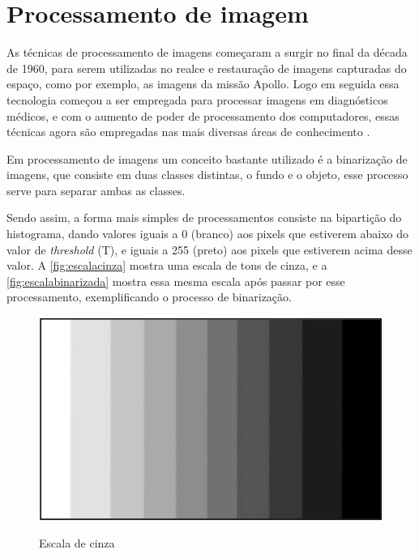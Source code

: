 \section{Processamento de imagem}\label{sec:processamento}

As técnicas de processamento de imagens começaram a surgir no final da década de 1960, 
para serem utilizadas no realce e restauração de imagens capturadas do espaço, 
como por exemplo, as imagens da missão Apollo. Logo em seguida essa tecnologia 
começou a ser empregada para processar imagens em diagnósticos médicos, e com 
o aumento de poder de processamento dos computadores, essas técnicas agora 
são empregadas nas mais diversas áreas de conhecimento \cite{gonzalez2010}.

Em processamento de imagens um conceito bastante utilizado é a binarização de
imagens, que consiste em duas classes distintas, o fundo e o objeto, esse processo 
serve para separar ambas as classes.

Sendo assim, a forma mais simples de processamentos consiste na
bipartição do histograma, dando valores iguais a 0 (branco) aos pixels que estiverem
abaixo do valor de \textit{threshold} (T), e iguais a 255 (preto) aos pixels que estiverem 
acima desse valor. A \autoref{fig:escalacinza} mostra uma escala de tons 
de cinza, e a \autoref{fig:escalabinarizada} mostra essa mesma escala após passar 
por esse processamento, exemplificando o processo de binarização.

\begin{figure}[h!]
    \centering
    \caption{Escala de cinza}
    \includegraphics[scale=0.25]{figuras/escala_cinza.png} 
    \fonte{}%
    \label{fig:escalacinza}
    \centering
\end{figure}

